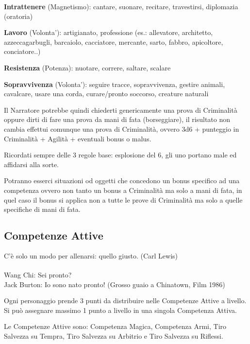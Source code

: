 \documentclass[a4paper,11pt,twoside,openany]{book}
\begin{document}
\textbf{Intrattenere} (Magnetismo): cantare, suonare, recitare, travestirsi, diplomazia (oratoria)

\textbf{Lavoro} (Volonta'): artigianato, professione (es.: allevatore, architetto, azzeccagarbugli, barcaiolo, cacciatore, mercante, sarto, fabbro, apicoltore, conciatore..)

\textbf{Resistenza} (Potenza): nuotare, correre, saltare, scalare

\textbf{Sopravvivenza} (Volonta'): seguire tracce, sopravvivenza, gestire animali, cavalcare, usare una corda, curare/pronto soccorso, creature naturali

\bigskip

Il Narratore potrebbe quindi chiederti genericamente una prova di Criminalità oppure dirti di fare una prova da mani di fata (borseggiare), il risultato non cambia effettui comunque una prova di Criminalità, ovvero 3d6 + punteggio in Criminalità + Agilità + eventuali bonus
o malus.

Ricordati sempre delle 3 regole base: esplosione del 6, gli uno portano male ed affidarsi alla sorte.

\bigskip

Potranno esserci situazioni od oggetti che concedono un bonus specifico ad una competenza ovvero non tanto un bonus a Criminalità ma solo a mani di fata, in quel caso il bonus si applica non a tutte le prove di Criminalità ma solo a quelle specifiche di mani di fata.


\subsection{Competenze Attive}

\label{competenze-attive}
\begin{tcolorbox}[enhanced,arc=5pt,boxrule=0.3pt]{C'è solo un modo per allenarsi: quello giusto. (Carl Lewis)\\\\
		Wang Chi: Sei pronto?\\
		Jack Burton: Io sono nato pronto! (Grosso guaio a Chinatown, Film 1986)
	}\end{tcolorbox}\medskip

Ogni personaggio prende 3 punti da distribuire nelle Competenze Attive a livello. Si può assegnare massimo 1 punto a livello in una singola Competenza Attiva.

Le Competenze Attive sono: Competenza Magica, Competenza Armi, Tiro Salvezza su Tempra, Tiro Salvezza su Arbitrio e Tiro Salvezza su Riflessi.
\end{document}
